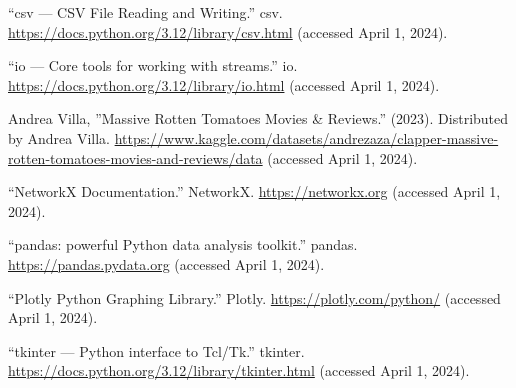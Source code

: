\documentclass[fontsize=11pt]{article}
\begin{document}
\begin{thebibliography}{9}

``csv — CSV File Reading and Writing.'' csv. \url{https://docs.python.org/3.12/library/csv.html} (accessed April 1, 2024).

``io — Core tools for working with streams.'' io. \url{https://docs.python.org/3.12/library/io.html} (accessed April 1, 2024).

Andrea Villa, ''Massive Rotten Tomatoes Movies \& Reviews.'' (2023). Distributed by Andrea Villa. \url{https://www.kaggle.com/datasets/andrezaza/clapper-massive-rotten-tomatoes-movies-and-reviews/data} (accessed April 1, 2024).

``NetworkX Documentation.'' NetworkX. \url{https://networkx.org} (accessed April 1, 2024).

``pandas: powerful Python data analysis toolkit.'' pandas. \url{https://pandas.pydata.org} (accessed April 1, 2024).

``Plotly Python Graphing Library.'' Plotly. \url{https://plotly.com/python/} (accessed April 1, 2024).

``tkinter — Python interface to Tcl/Tk.'' tkinter. \url{https://docs.python.org/3.12/library/tkinter.html} (accessed April 1, 2024).

\end{thebibliography}
\end{document}
